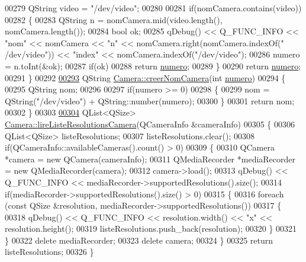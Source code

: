 \begin{DoxyCode}
00279     QString video = \textcolor{stringliteral}{"/dev/video"};
00280 
00281     \textcolor{keywordflow}{if}(nomCamera.contains(video))
00282     \{
00283         QString n = nomCamera.mid(video.length(), nomCamera.length());
00284         \textcolor{keywordtype}{bool} ok;
00285         qDebug() << Q\_FUNC\_INFO << \textcolor{stringliteral}{"nom"} << nomCamera << \textcolor{stringliteral}{"n"} << nomCamera.right(nomCamera.indexOf(\textcolor{stringliteral}{"
      /dev/video"})) << \textcolor{stringliteral}{"index"} << nomCamera.indexOf(\textcolor{stringliteral}{"/dev/video"});
00286         numero = n.toInt(&ok);
00287         \textcolor{keywordflow}{if}(ok)
00288             \textcolor{keywordflow}{return} \hyperlink{class_camera_ae5cda5df3c9c49b88fff15389a1bbc64}{numero};
00289     \}
00290     \textcolor{keywordflow}{return} \hyperlink{class_camera_ae5cda5df3c9c49b88fff15389a1bbc64}{numero};
00291 \}
00292 
\hyperlink{class_camera_a506d459df95042a03894afd5b781c2aa}{00293} QString \hyperlink{class_camera_a506d459df95042a03894afd5b781c2aa}{Camera::creerNomCamera}(\textcolor{keywordtype}{int} \hyperlink{class_camera_ae5cda5df3c9c49b88fff15389a1bbc64}{numero})
00294 \{
00295     QString nom;
00296 
00297     \textcolor{keywordflow}{if}(numero >= 0)
00298     \{
00299         nom = QString(\textcolor{stringliteral}{"/dev/video"}) + QString::number(numero);
00300     \}
00301     \textcolor{keywordflow}{return} nom;
00302 \}
00303 
\hyperlink{class_camera_ac4756add4cb6bef60e38f3da79c2383f}{00304} QList<QSize> \hyperlink{class_camera_ac4756add4cb6bef60e38f3da79c2383f}{Camera::lireListeResolutionsCamera}(QCameraInfo &cameraInfo)
00305 \{
00306     QList<QSize> listeResolutions;
00307     listeResolutions.clear();
00308     \textcolor{keywordflow}{if}(QCameraInfo::availableCameras().count() > 0)
00309     \{
00310         QCamera *camera = \textcolor{keyword}{new} QCamera(cameraInfo);
00311         QMediaRecorder *mediaRecorder = \textcolor{keyword}{new} QMediaRecorder(camera);
00312         camera->load();
00313         qDebug() << Q\_FUNC\_INFO << mediaRecorder->supportedResolutions().size();
00314         \textcolor{keywordflow}{if}(mediaRecorder->supportedResolutions().size() > 0)
00315         \{
00316             \textcolor{keywordflow}{foreach} (\textcolor{keyword}{const} QSize &resolution, mediaRecorder->supportedResolutions())
00317             \{
00318                 qDebug() << Q\_FUNC\_INFO << resolution.width() << \textcolor{stringliteral}{"x"} << resolution.height();
00319                 listeResolutions.push\_back(resolution);
00320             \}
00321         \}
00322         \textcolor{keyword}{delete} mediaRecorder;
00323         \textcolor{keyword}{delete} camera;
00324     \}
00325     \textcolor{keywordflow}{return} listeResolutions;
00326 \}
\end{DoxyCode}
